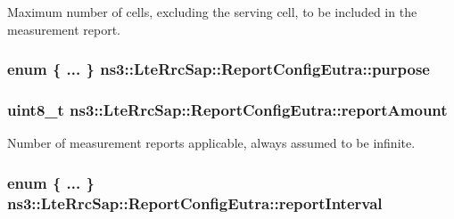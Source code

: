 Maximum number of cells, excluding the serving cell, to be included in the measurement report. 

\subsubsection[{\texorpdfstring{purpose}{purpose}}]{\setlength{\rightskip}{0pt plus 5cm}enum \{ ... \}   ns3\+::\+Lte\+Rrc\+Sap\+::\+Report\+Config\+Eutra\+::purpose}\hypertarget{structns3_1_1LteRrcSap_1_1ReportConfigEutra_a606ee524fac01f508f747892e377e07d}{}\label{structns3_1_1LteRrcSap_1_1ReportConfigEutra_a606ee524fac01f508f747892e377e07d}
\subsubsection[{\texorpdfstring{report\+Amount}{reportAmount}}]{\setlength{\rightskip}{0pt plus 5cm}uint8\+\_\+t ns3\+::\+Lte\+Rrc\+Sap\+::\+Report\+Config\+Eutra\+::report\+Amount}\hypertarget{structns3_1_1LteRrcSap_1_1ReportConfigEutra_a3c7035b91b07fcf1c2b38ed0d1914b3d}{}\label{structns3_1_1LteRrcSap_1_1ReportConfigEutra_a3c7035b91b07fcf1c2b38ed0d1914b3d}


Number of measurement reports applicable, always assumed to be infinite. 

\subsubsection[{\texorpdfstring{report\+Interval}{reportInterval}}]{\setlength{\rightskip}{0pt plus 5cm}enum \{ ... \}   ns3\+::\+Lte\+Rrc\+Sap\+::\+Report\+Config\+Eutra\+::report\+Interval}\hypertarget{structns3_1_1LteRrcSap_1_1ReportConfigEutra_a8688bf528a9f1a027fe8570965adacdb}{}\label{structns3_1_1LteRrcSap_1_1ReportConfigEutra_a8688bf528a9f1a027fe8570965adacdb}


